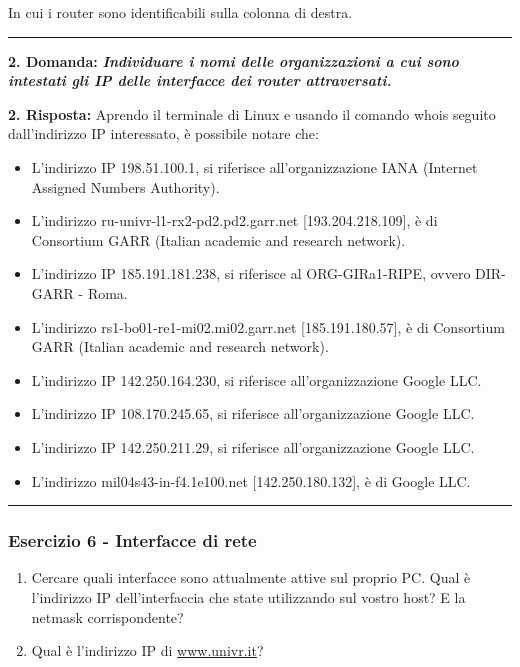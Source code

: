 \documentclass[a4paper]{article}
\newcommand{\longline}{\noindent\rule{\textwidth}{0.4pt}}
\begin{document}
	\noindent
	In cui i router sono identificabili sulla colonna di destra.
	
	\longline\newline
	
	\noindent
	\textcolor{Red3}{\textbf{2. Domanda:}} \textbf{\emph{Individuare i nomi delle organizzazioni a cui sono intestati gli IP delle interfacce dei router attraversati.}}\newline
	
	\noindent
	\textcolor{Green4}{\textbf{2. Risposta:}} Aprendo il terminale di Linux e usando il comando \textsf{whois} seguito dall'indirizzo IP interessato, è possibile notare che:
	\begin{itemize}
		\item L'indirizzo IP 198.51.100.1, si riferisce all'organizzazione IANA (Internet Assigned Numbers Authority).
		
		\item L'indirizzo \textsf{ru-univr-l1-rx2-pd2.pd2.garr.net [193.204.218.109]}, è di Consortium GARR (Italian academic and research network).
		
		\item L'indirizzo IP 185.191.181.238, si riferisce al ORG-GIRa1-RIPE, ovvero DIR-GARR - Roma.
		
		\item L'indirizzo \textsf{rs1-bo01-re1-mi02.mi02.garr.net [185.191.180.57]}, è di Consortium GARR (Italian academic and research network).
		
		\item L'indirizzo IP 142.250.164.230, si riferisce all'organizzazione Google LLC.
		
		\item L'indirizzo IP 108.170.245.65, si riferisce all'organizzazione Google LLC.
		
		\item L'indirizzo IP 142.250.211.29, si riferisce all'organizzazione Google LLC.
		
		\item L'indirizzo \textsf{mil04s43-in-f4.1e100.net [142.250.180.132]}, è di Google LLC.
	\end{itemize}
	
	\longline
	
	\subsubsection{Esercizio 6 - Interfacce di rete}
	
	\begin{enumerate}
		\item Cercare quali interfacce sono attualmente attive sul proprio PC. Qual è l'indirizzo IP dell'interfaccia che state utilizzando sul vostro host? E la netmask corrispondente?
		
		\item Qual è l'indirizzo IP di \url{www.univr.it}?
	\end{enumerate}
	
\end{document}
